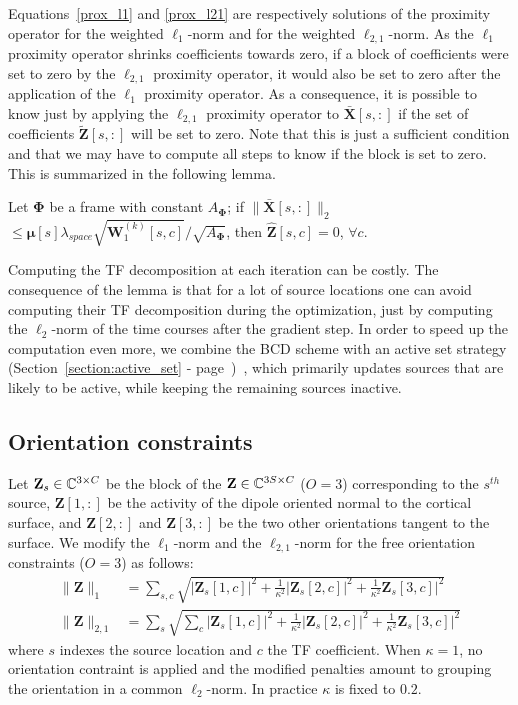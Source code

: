 Equations~\eqref{prox_l1} and \eqref{prox_l21} are respectively solutions of the proximity operator for the weighted $\ell_1$-norm and for the weighted $\ell_{2,1}$-norm. As the $\ell_1$ proximity operator shrinks coefficients towards zero, if a block of coefficients were set to zero by the $\ell_{2,1}$ proximity operator, it would also be set to zero after the application of the $\ell_1$ proximity operator. As a consequence, it is possible to know just by applying the $\ell_{2,1}$ proximity operator to $\bar{\mathbf{X}}[s,:]$ if the set of coefficients $\tilde{\mathbf{Z}}[s,:]$ will be set to zero. Note that this is just a sufficient condition and that we may have to compute all steps to know if the block is set to zero. This is summarized in the following lemma.

\begin{lemma}
    Let $\mathbf{\Phi}$ be a frame with constant $A_{\mathbf{\Phi}}$; if $\|\bar{\mathbf{X}}[s,:]\|_2$ $\leq \mathbf{\mu}[s]\lambda_{space}\sqrt{\mathbf{W}_1^{(k)}[s,c]} / \sqrt{A_{\mathbf{\Phi}}}$, then $\hat{\mathbf{Z}}[s,c] = 0$, $\forall c$.
\end{lemma}

Computing the TF decomposition at each iteration can be costly. The consequence of the lemma is that for a lot of source locations one can avoid computing their TF decomposition during the optimization, just by computing the $\ell_{2}$-norm of the time courses after the gradient step.
In order to speed up the computation even more, we combine the BCD scheme with an active set strategy (Section~\ref{section:active_set} - page~\pageref{section:active_set})~\cite{friedman2010regularization}, which primarily updates sources that are likely to be active, while keeping the remaining sources inactive.

\subsection*{Orientation constraints}
Let $\mathbf{Z}_s\in\mathbb{C}^{3\times C}$ be the block of the $\mathbf{Z}\in\mathbb{C}^{3S\times C}$	($O=3$) corresponding to the $s^{th}$ source, $\mathbf{Z}[1,:]$ be the activity of the dipole oriented normal to the cortical surface, and $\mathbf{Z}[2,:]$ and $\mathbf{Z}[3,:]$ be the two other orientations tangent to the surface. We modify the $\ell_1$-norm and the $\ell_{2,1}$-norm for the free orientation constraints ($O=3$) as follows:
\begin{align*}
\|\mathbf{Z}\|_1 &= \sum_{s,c}\sqrt{|\mathbf{Z}_s[1,c]|^2 + \frac{1}{\kappa^2}|\mathbf{Z}_s[2,c]|^2 + \frac{1}{\kappa^2}\mathbf{Z}_s[3,c]|^2} \\
\|\mathbf{Z}\|_{2,1} &= \sum_s\sqrt{\sum_c |\mathbf{Z}_s[1,c]|^2 + \frac{1}{\kappa^2}|\mathbf{Z}_s[2,c]|^2 + \frac{1}{\kappa^2}\mathbf{Z}_s[3,c]|^2}
\end{align*}
where $s$ indexes the source location and $c$ the TF coefficient. When $\kappa=1$, no orientation contraint is applied and the modified penalties amount to grouping the orientation in a common $\ell_2$-norm. In practice $\kappa$ is fixed to $0.2$.

